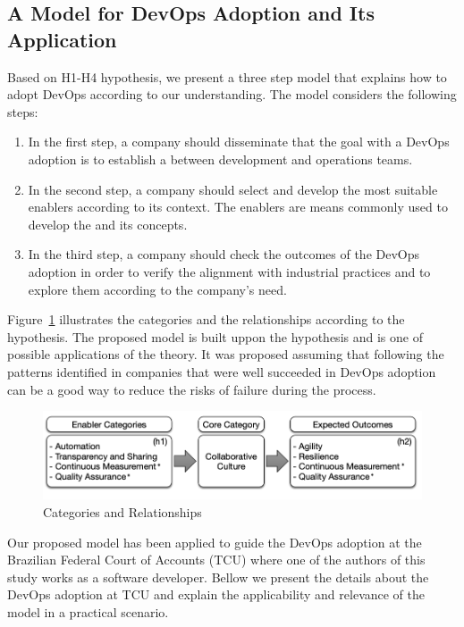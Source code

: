 \subsection{A Model for DevOps Adoption and Its Application}\label{sec:case_study}

Based on H1-H4 hypothesis, we present a three step model that
explains how to adopt DevOps according to our understanding. The
model considers the following steps:

\begin{enumerate}
\item In the first step, a company should
disseminate that the goal with a DevOps adoption is to
establish a \cc between
development and operations teams.

\item In the second step, a company should select and develop
the most suitable enablers according to its context. The enablers
are means commonly used to develop the \cc
and its concepts.

\item In the third step, a company should check the outcomes of the
DevOps adoption in order to verify the alignment with
industrial practices and to explore them according to the company's need.
\end{enumerate}

{
\color{blue}
Figure~\ref{model} illustrates the categories and the
relationships according to the hypothesis. The proposed model is built uppon
the hypothesis and is one of possible applications of the theory. It was proposed
assuming that following the patterns identified in companies that were
well succeeded in DevOps adoption can be a good way to reduce the risks of
failure during the process.
}

\begin{figure}
  \centering
  \includegraphics[width=.65\textwidth]{model.png}
  \caption{Categories and Relationships}
  \label{model}
\end{figure}

{
\color{blue}
Our proposed model has been applied to guide the DevOps adoption at the
Brazilian Federal Court of Accounts (TCU) where one of the authors of this study
works as a software developer. Bellow we present the details about the DevOps
adoption at TCU and explain the applicability and relevance of the model in a
practical scenario.
}
